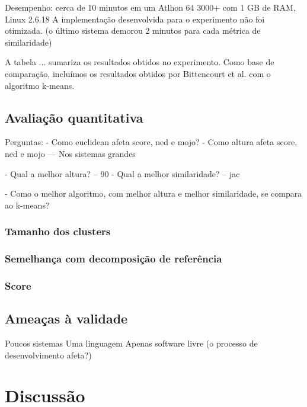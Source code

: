 Desempenho: cerca de 10 minutos em um Atlhon 64 3000+ com 1 GB de RAM, Linux 2.6.18
A implementação desenvolvida para o experimento não foi otimizada.
(o último sistema demorou 2 minutos para cada métrica de similaridade)

A tabela ... sumariza os resultados obtidos no experimento. Como base de 
comparação, incluímos os resultados obtidos por Bittencourt et al. com o 
algoritmo k-means.

\subsection{Avaliação quantitativa}


Perguntas:
- Como euclidean afeta score, ned e mojo?
- Como altura afeta score, ned e mojo
--- Nos sistemas grandes

- Qual a melhor altura?
-- 90
- Qual a melhor similaridade?
-- jac

- Como o melhor algoritmo, com melhor altura e melhor similaridade, se compara 
ao k-means?

\subsubsection{Tamanho dos clusters}

\subsubsection{Semelhança com decomposição de referência}

\subsubsection{Score}



\subsection{Ameaças à validade}

Poucos sistemas
Uma linguagem
Apenas software livre (o processo de desenvolvimento afeta?)



\section{Discussão} \label{sec:discussao}


